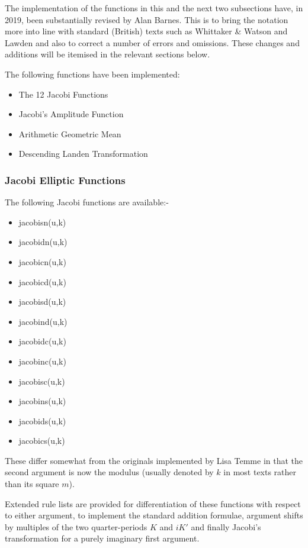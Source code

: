 The implementation of the functions in this and the next two subsections have, in 2019,
been substantially revised by Alan Barnes. This is to bring the
notation more into line with standard (British) texts such as Whittaker
\& Watson \cite{Whittaker:69} and Lawden \cite{Lawden:89} and also to correct
a number of errors and omissions. These changes and additions will be itemised in the relevant
sections below.

The following functions have been implemented:

\begin{itemize}
\item The 12 Jacobi Functions
\item Jacobi's Amplitude Function
\item Arithmetic Geometric Mean
\item Descending Landen Transformation
\end{itemize}
\subsubsection{Jacobi Elliptic Functions}
The following Jacobi functions are available:-

\begin{itemize}
\item jacobisn(u,k)
\item jacobidn(u,k)
\item jacobicn(u,k)
\item jacobicd(u,k)
\item jacobisd(u,k)
\item jacobind(u,k)
\item jacobidc(u,k)
\item jacobinc(u,k)
\item jacobisc(u,k)
\item jacobins(u,k)
\item jacobids(u,k)
\item jacobics(u,k)
\end{itemize}
These differ somewhat from the originals implemented by Lisa Temme in that
the second argument is now the modulus (usually denoted by $k$ in most texts
rather than its square $m$).

Extended rule lists are provided for differentiation of these functions with
respect to either argument, to implement the standard addition formulae,
argument shifts by multiples of the two quarter-periods $K$ and $iK'$ and
finally Jacobi's transformation for a purely imaginary first argument.

